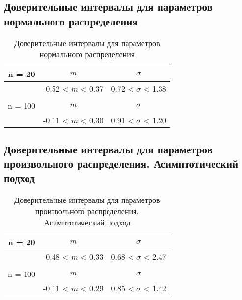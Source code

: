 \subsection{Доверительные интервалы для параметров нормального распределения}
\begin{table}[H]
	\centering
	\begin{tabular}{| c | c | c |}
		\hline
		n = 20   &  $m$  & $\sigma$\\ \hline
		&  -0.52 < $m$ < 0.37 & 0.72 < $\sigma$ < 1.38 \\ \hline
		&   &   \\ \hline
		n = 100   &  $m$  & $\sigma$\\ \hline
		& -0.11 < $m$ < 0.30 & 0.91 < $\sigma$ < 1.20 \\
		\hline
	\end{tabular}
	\caption{Доверительные интервалы для параметров нормального распределения}
	\label{tab:interv_simple}
\end{table}

\subsection{Доверительные интервалы для параметров произвольного распределения. Асимптотический подход}
\begin{table}[H]
	\centering
	\begin{tabular}{| c | c | c |}
		\hline
		n = 20   &  $m$  & $\sigma$\\ \hline
		&  -0.48 < $m$ < 0.33 & 0.68 < $\sigma$ < 2.47 \\ \hline
		&   &   \\ \hline
		n = 100   &  $m$  & $\sigma$\\ \hline
		& -0.11 < $m$ < 0.29 & 0.85 < $\sigma$ < 1.42 \\
		\hline
	\end{tabular}
	\caption{Доверительные интервалы для параметров произвольного распределения. Асимптотический подход}
	\label{tab:interv_asimpt}
\end{table}